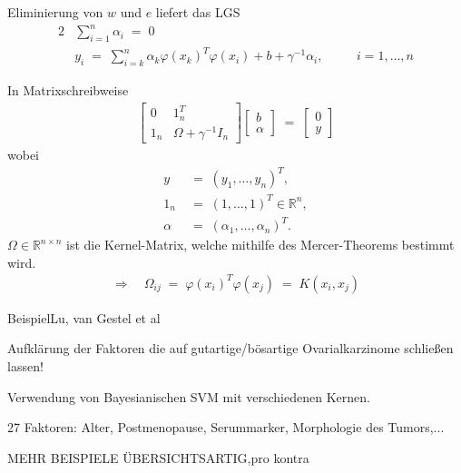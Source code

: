 \documentclass{beamer}
\begin{document}
{\begin{frame}
	Eliminierung von $w$ und $e$ liefert das LGS
	\begin{alignat}{2}
		&\sum_{i=1}^{n}\alpha_i \;=\;0 && \\
		&y_i\;=\;\sum_{i=k}^{n}\alpha_k\varphi(x_k)^T\varphi(x_i)+b+\gamma^{-1}\alpha_i,\quad && i=1,\dots,n
	\end{alignat}
\end{frame}

\begin{frame}
	In Matrixschreibweise
	\begin{align}
		\begin{bmatrix}
			0& 1_n^T \\[0,5cm]
			1_n& \Omega+\gamma^{-1}I_n
		\end{bmatrix}
		\begin{bmatrix}
			b \\[0,2cm]
			\alpha
		\end{bmatrix}\;=\;
		\begin{bmatrix}
			0 \\[0,2cm] 
			y
		\end{bmatrix} 
	\end{align}
	wobei
	\begin{align}
		y &\;=\;(y_1,\dots,y_n)^T,\\
		1_n &\;=\;(1,\dots,1)^T\in\mathbb{R}^n,\\
		\alpha &\;=\;(\alpha_1,\dots,\alpha_n)^T.
	\end{align}
	$\Omega\in\mathbb{R}^{n\times n}$ ist die Kernel-Matrix, welche mithilfe des Mercer-Theorems bestimmt wird.\\
	\begin{align}
		\Rightarrow\quad\Omega_{ij} \;=\;\varphi(x_i)^T\varphi(x_j)\;=\;K(x_i,x_j)
	\end{align}
\end{frame}

\begin{frame}{Beispiel}{Lu, van Gestel et al}


Aufklärung der Faktoren die auf gutartige/bösartige Ovarialkarzinome schließen lassen!

Verwendung von Bayesianischen SVM mit verschiedenen Kernen.

27 Faktoren: Alter, Postmenopause, Serummarker, Morphologie des Tumors,...


MEHR BEISPIELE ÜBERSICHTSARTIG,pro kontra


\end{frame}}
\end{document}

